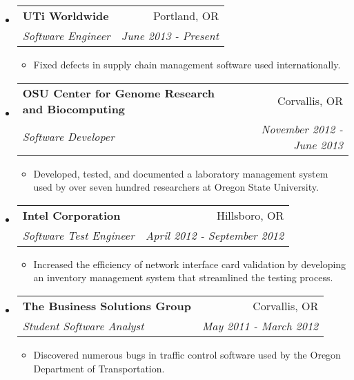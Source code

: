 \documentclass[letterpaper,11pt]{article}
\makeatletter
\newcommand{\resitem}[1]{\item #1 \vspace{-2pt}}
\newcommand{\ressubheading}[4]{

\begin{tabular*}{6.5in}{l@{\cftdotfill{\cftsecdotsep}\extracolsep{\fill}}r}

\textbf{#1} & #2 \\

\textit{#3} & \textit{#4} \\

\end{tabular*}\vspace{-6pt}}
\makeatother
\begin{document}
\begin{itemize}

	\item
	
	\ressubheading{UTi Worldwide}{Portland, OR}{Software Engineer}{June 2013 - Present}

	\begin{itemize}

	\resitem{Fixed defects in supply chain management software used internationally.}

	\end{itemize}

	\item
        
	\ressubheading{OSU Center for Genome Research and Biocomputing}{Corvallis, OR}{Software Developer}{November 2012 - June 2013}

        \begin{itemize}

    	\resitem{Developed, tested, and documented a laboratory management system used by over seven hundred researchers at Oregon State University.}

	\end{itemize}

	\item
        
	\ressubheading{Intel Corporation}{Hillsboro, OR}{Software Test Engineer}{April 2012 - September 2012}

        \begin{itemize}

    	\resitem{Increased the efficiency of network interface card validation by developing an inventory management system that streamlined the testing process.}

	\end{itemize}

	\item
	
	\ressubheading{The Business Solutions Group}{Corvallis, OR}{Student Software Analyst}{May 2011 -  March 2012}

       	\begin{itemize}

	\resitem{Discovered numerous bugs in traffic control software used by the Oregon Department of Transportation.}

	\end{itemize}
	
\end{itemize}
\end{document}

